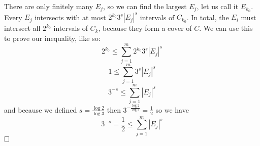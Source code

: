 \documentclass{article}
\begin{document}
\begin{example}
There are only finitely many $E_j$, so we can find the largest $E_j$, let us call it $E_{k_0}$. Every $E_j$ intersects with at most $2^{k_0}3^s|E_j|^s$ intervals of $C_{k_0}$. In total, the $E_i$ must intersect all $2^{k_0}$ intervals of $C_k$, because they form a cover of $C$. We can use this to prove our inequality, like so:
$$2^{k_0}\leq \sum_{j=1}^m 2^{k_0}3^s |E_j|^s$$
$$1\leq \sum_{j=1}^m 3^s |E_j|^s$$
$$3^{-s}\leq \sum_{j=1}^m |E_j|^s$$
and because we defined $s=\frac{\log{2}}{\log{3}}$ then $3^{-\frac{\log{2}}{\log{3}}}=\frac{1}{2}$
so we have 
$$3^{-s}=\frac{1}{2}\leq \sum_{j=1}^m |E_j|^s$$
$\qed$
\end{example}



\end{document}
